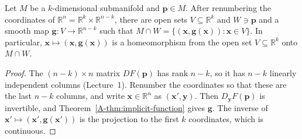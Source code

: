 \begin{proposition}\label{A-prop:local-graph}
    Let $M$ be a $k$-dimensional submanifold and $\mathbf{p} \in M$. After renumbering the coordinates of $\mathbb{R}^n = \mathbb{R}^k \times \mathbb{R}^{n-k}$, there are open sets $V \subseteq \mathbb{R}^k$ and $W \ni \mathbf{p}$ and a smooth map $\mathbf{g}: V \to \mathbb{R}^{n-k}$ such that $M \cap W = \{(\mathbf{x}, \mathbf{g}(\mathbf{x})) : \mathbf{x} \in V\}$. In particular, $\mathbf{x} \mapsto (\mathbf{x}, \mathbf{g}(\mathbf{x}))$ is a homeomorphism from the open set $V \subseteq \mathbb{R}^k$ onto $M \cap W$.
\end{proposition}

\begin{proof}
    The $(n - k) \times n$ matrix $DF(\mathbf{p})$ has rank $n - k$, so it has $n - k$ linearly independent columns (Lecture~1). Renumber the coordinates so that these are the last $n - k$ columns, and write $\mathbf{x} \in \mathbb{R}^n$ as $(\mathbf{x}', \mathbf{y})$. Then $D_{\mathbf{y}}F(\mathbf{p})$ is invertible, and Theorem~\ref{A-thm:implicit-function} gives $\mathbf{g}$. The inverse of $\mathbf{x}' \mapsto (\mathbf{x}', \mathbf{g}(\mathbf{x}'))$ is the projection to the first $k$ coordinates, which is continuous.
\end{proof}

